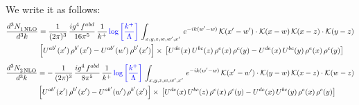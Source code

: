 \documentclass[9pt]{article}
\numberwithin{equation}{section}
\begin{document}
We write it as follows: 
\begin{align}
   \frac{d^{3}N_{1\,\rm NLO}^{\rm}}{d^{3}k}  & = \frac{1}{(2\pi)^{3}}\,\frac{ig^{4}\,f^{abd}}{16\pi^{5}}\,\frac{1}{k^{+}}\,{\color{blue}\log{\left[\frac{k^{+}}{\Lambda}\right]}}\,\int_{x,y,z,w,w',x'}\,e^{-ik(w^\prime-w)}\, \mathcal{K}(x'-w')\cdot \mathcal{K}(x-w)\, \mathcal{K}(x-z)\cdot \mathcal{K}(y-z) \notag \\ & \left[U^{ab'}(x')\,\rho^{b'}(x')-U^{ab'}(w')\, \rho^{b'}(x')\right]\times\, \left[U^{de}(x)\,U^{bc}(z)\, \rho^{e}(x)\,\rho^{c}(y)-U^{de}(x)\,U^{bc}(y)\,\rho^{e}(x)\,\rho^{c}(y)\right]
\end{align}
\begin{align}
   \frac{d^{3}N_{2\,\rm NLO}^{\rm}}{d^{3}k}  & = -\,\frac{1}{(2\pi)^{3}}\, \frac{ig^{4}\, f^{abd}}{8\pi^{5}}\, \frac{1}{k^{+}}\,{\color{blue}\log{\left[\frac{k^{+}}{\Lambda}\right]}}\,\int_{x,y,z,w,w',x'}\,e^{-ik(w^\prime-w)}\, \mathcal{K}(x'-w')\cdot \mathcal{K}(y-w)\,\mathcal{K}(x-z)\cdot \mathcal{K}(w-z) \notag \\ & \left[U^{ab'}(x')\,\rho^{b'}(x')-U^{ab'}(w')\, \rho^{b'}(x')\right]\times\,\left[U^{de}(x)\,U^{bc}(z)\, \rho^{e}(x)\,\rho^{c}(y)-U^{de}(x)\,U^{bc}(y)\,\rho^{e}(x)\,\rho^{c}(y)\right] 
\end{align}
\end{document}
